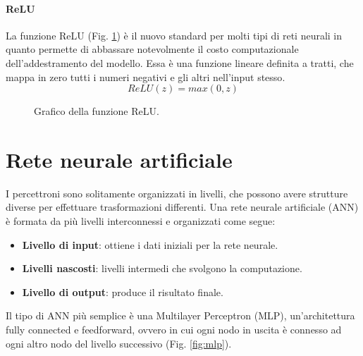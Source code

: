 		\paragraph{ReLU}
		La funzione ReLU (Fig. \ref{fig:relu}) è il nuovo standard per molti tipi di reti neurali in quanto permette di abbassare notevolmente il costo computazionale dell'addestramento del modello. Essa è una funzione lineare definita a tratti, che mappa in zero tutti i numeri negativi e gli altri nell'input stesso\cite{ReLU}.
		\[ ReLU(z) = max(0, z) \]
		\begin{figure}%
			\centering
			\caption{Grafico della funzione ReLU.}
			\label{fig:relu}
		\end{figure}
		
		\section{Rete neurale artificiale}
		I percettroni sono solitamente organizzati in livelli, che possono avere strutture diverse per effettuare trasformazioni differenti. Una rete neurale artificiale (ANN) è formata da più livelli interconnessi e organizzati come segue:
		\begin{itemize}
			\item \textbf{Livello di input}: ottiene i dati iniziali per la rete neurale.
			\item \textbf{Livelli nascosti}: livelli intermedi che svolgono la computazione.
			\item \textbf{Livello di output}: produce il risultato finale.
		\end{itemize}
		Il tipo di ANN più semplice è una Multilayer Perceptron (MLP), un'architettura fully connected e feedforward, ovvero in cui ogni nodo in uscita è connesso ad ogni altro nodo del livello successivo (Fig. \ref{fig:mlp}).
		
		
